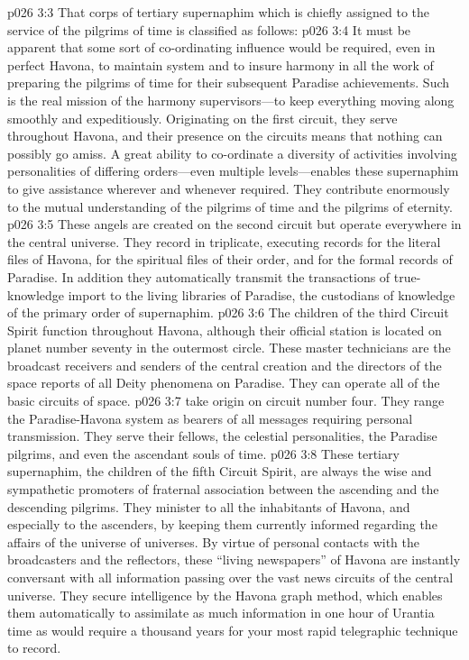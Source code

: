 \pc \vs p026 3:3 That corps of tertiary supernaphim which is chiefly assigned to the service of the pilgrims of time is classified as follows:
\pc \vs p026 3:4 \bibnobreakspace {} It must be apparent that some sort of co\hyp{}ordinating influence would be required, even in perfect Havona, to maintain system and to insure harmony in all the work of preparing the pilgrims of time for their subsequent Paradise achievements. Such is the real mission of the harmony supervisors---to keep everything moving along smoothly and expeditiously. Originating on the first circuit, they serve throughout Havona, and their presence on the circuits means that nothing can possibly go amiss. A great ability to co\hyp{}ordinate a diversity of activities involving personalities of differing orders---even multiple levels---enables these supernaphim to give assistance wherever and whenever required. They contribute enormously to the mutual understanding of the pilgrims of time and the pilgrims of eternity.
\pc \vs p026 3:5 \bibnobreakspace {} These angels are created on the second circuit but operate everywhere in the central universe. They record in triplicate, executing records for the literal files of Havona, for the spiritual files of their order, and for the formal records of Paradise. In addition they automatically transmit the transactions of true\hyp{}knowledge import to the living libraries of Paradise, the custodians of knowledge of the primary order of supernaphim.
\pc \vs p026 3:6 \bibnobreakspace {} The children of the third Circuit Spirit function throughout Havona, although their official station is located on planet number seventy in the outermost circle. These master technicians are the broadcast receivers and senders of the central creation and the directors of the space reports of all Deity phenomena on Paradise. They can operate all of the basic circuits of space.
\pc \vs p026 3:7 \bibnobreakspace {} take origin on circuit number four. They range the Paradise\hyp{}Havona system as bearers of all messages requiring personal transmission. They serve their fellows, the celestial personalities, the Paradise pilgrims, and even the ascendant souls of time.
\pc \vs p026 3:8 \bibnobreakspace {} These tertiary supernaphim, the children of the fifth Circuit Spirit, are always the wise and sympathetic promoters of fraternal association between the ascending and the descending pilgrims. They minister to all the inhabitants of Havona, and especially to the ascenders, by keeping them currently informed regarding the affairs of the universe of universes. By virtue of personal contacts with the broadcasters and the reflectors, these “living newspapers” of Havona are instantly conversant with all information passing over the vast news circuits of the central universe. They secure intelligence by the Havona graph method, which enables them automatically to assimilate as much information in one hour of Urantia time as would require a thousand years for your most rapid telegraphic technique to record.
